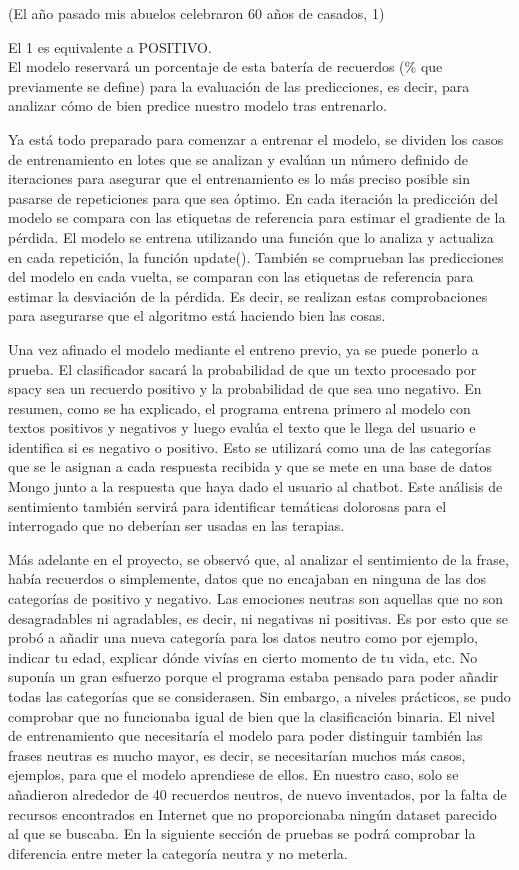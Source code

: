 (El año pasado mis abuelos celebraron 60 años de casados, 1) 

El 1 es equivalente a POSITIVO.\\

El modelo reservará un porcentaje de esta batería de recuerdos (\% que previamente se define) para la evaluación de las predicciones, es decir, para analizar cómo de bien predice nuestro modelo tras entrenarlo. 

Ya está todo preparado para comenzar a entrenar el modelo, se dividen los casos de entrenamiento en lotes que se analizan y evalúan un número definido de iteraciones para asegurar que el entrenamiento es lo más preciso posible sin pasarse de repeticiones para que sea óptimo. En cada iteración la predicción del modelo se compara con las etiquetas de referencia para estimar el gradiente de la pérdida. El modelo se entrena utilizando una función que lo analiza y actualiza en cada repetición, la función update(). También se comprueban las predicciones del modelo en cada vuelta, se comparan con las etiquetas de referencia para estimar la desviación de la pérdida. Es decir, se realizan estas comprobaciones para asegurarse que el algoritmo está haciendo bien las cosas.

Una vez afinado el modelo mediante el entreno previo, ya se puede ponerlo a prueba. El clasificador sacará la probabilidad de que un texto procesado por spacy sea un recuerdo positivo y la probabilidad de que sea uno negativo. En resumen, como se ha explicado, el programa entrena primero al modelo con textos positivos y negativos y luego evalúa el texto que le llega del usuario e identifica si es negativo o positivo. Esto se utilizará como una de las categorías que se le asignan a cada respuesta recibida y que se mete en una base de datos Mongo junto a la respuesta que haya dado el usuario al chatbot. Este análisis de sentimiento también servirá para identificar temáticas dolorosas para el interrogado que no deberían ser usadas en las terapias.

Más adelante en el proyecto, se observó que, al analizar el sentimiento de la frase, había recuerdos o simplemente, datos que no encajaban en ninguna de las dos categorías de positivo y negativo. Las emociones neutras son aquellas que no son desagradables ni agradables, es decir, ni negativas ni positivas. Es por esto que se probó a añadir una nueva categoría para los datos neutro como por ejemplo, indicar tu edad, explicar dónde vivías en cierto momento de tu vida, etc. No suponía un gran esfuerzo porque el programa estaba pensado para poder añadir todas las categorías que se considerasen. Sin embargo, a niveles prácticos, se pudo comprobar que no funcionaba igual de bien que la clasificación binaria. El nivel de entrenamiento que necesitaría el modelo para poder distinguir también las frases neutras es mucho mayor, es decir, se necesitarían muchos más casos, ejemplos, para que el modelo aprendiese de ellos. En nuestro caso, solo se añadieron alrededor de 40 recuerdos neutros, de nuevo inventados, por la falta de recursos encontrados en Internet que no proporcionaba ningún dataset parecido al que se buscaba. En la siguiente sección de pruebas se podrá comprobar la diferencia entre meter la categoría neutra y no meterla. 

